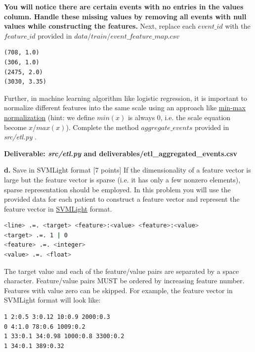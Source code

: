 \documentclass[12pt]{article}
\begin{document}
\textbf{You will notice there are certain events with no entries in the values column. Handle these missing values by removing all events with null values while constructing the features.}
Next, replace each $event\_id$ with the $feature\_id$ provided in $data/train/event\_feature\_map.csv$

\begin{lstlisting}[frame=single]
(708, 1.0)
(306, 1.0)
(2475, 2.0)
(3030, 3.35)
\end{lstlisting}

Further, in machine learning algorithm like logistic regression, it is important to normalize different features into the same scale using an approach like \href{http://stats.stackexchange.com/questions/70801/how-to-normalize-data-to-0-1-range}{min-max normalization} (hint: we define $min(x)$ is always 0, i.e. the scale equation become $x$/$max(x)$). Complete the method \textit{$aggregate\_events$} provided in \textit{src/etl.py} . 
\newline

\textbf{Deliverable: \textit{src/etl.py} and deliverables/etl\_aggregated\_events.csv}
\newline

\textbf{d.} Save in  SVMLight format [7 points]
\newline
If the dimensionality of a feature vector is large but the feature vector is sparse (i.e. it has only a few nonzero elements), sparse representation should be employed. In this problem you will use the provided data for each patient to construct a feature vector and represent the feature vector in \href{http://svmlight.joachims.org/}{SVMLight} format. \\

\begin{lstlisting}[frame=single, language=bash]
<line> .=. <target> <feature>:<value> <feature>:<value> 
<target> .=. 1 | 0
<feature> .=. <integer> 
<value> .=. <float>
\end{lstlisting}

The target value and each of the feature/value pairs are separated by a space character. Feature/value pairs MUST be ordered by increasing feature number. Features with value zero can be skipped. For example, the feature vector in SVMLight format will look like: \\

\begin{lstlisting}[frame=single, language=bash]
1 2:0.5 3:0.12 10:0.9 2000:0.3
0 4:1.0 78:0.6 1009:0.2
1 33:0.1 34:0.98 1000:0.8 3300:0.2
1 34:0.1 389:0.32 
\end{lstlisting}
\end{document}
